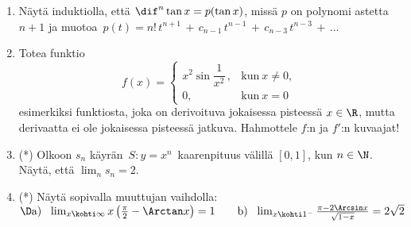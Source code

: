 \begin{enumerate}
\item
Näytä induktiolla, että $\dif^n\tan x=p(\tan x)$, missä $p$ on polynomi astetta $n+1$ ja
muotoa $\,p(t)=n!\,t^{n+1}\,+\,c_{n-1}\,t^{n-1}\,+\,c_{n-3}\,t^{n-3}\,+\,\ldots$

\item
Totea funktio
\[
f(x)=\begin{cases} 
     x^2\sin\dfrac{1}{x^2}\,, &\text{kun}\ x \neq 0, \\ 0, &\text{kun}\ x=0
     \end{cases} \]
esimerkiksi funktiosta, joka on derivoituva jokaisessa pisteessä $x\in\R$, mutta derivaatta
ei ole jokaisessa pisteessä jatkuva. Hahmottele $f$:n ja $f'$:n kuvaajat!

\item (*)
Olkoon $s_n$ käyrän $\,S: y=x^n\,$ kaarenpituus välillä $[0,1]$, kun $n\in\N$. Näytä, että
$\lim_n s_n = 2$.

\item (*)
Näytä sopivalla muuttujan vaihdolla: \vspace{1mm}\newline
$\D
\text{a)}\ \ \lim_{x\kohti\infty} x\left(\frac{\pi}{2}-\Arctan x\right)=1 \qquad 
\text{b)}\ \ \lim_{x \kohti 1^-} \frac{\pi-2\Arcsin x}{\sqrt{1-x}}=2\sqrt{2}$

\end{enumerate}